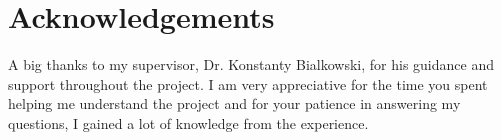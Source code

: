 
\chapter*{Acknowledgements \label{sec:acknowledgements}}

A big thanks to my supervisor, Dr. Konstanty Bialkowski, for his guidance and support throughout the project. I am very appreciative for the time you spent helping me understand the project and for your patience in answering my questions, I gained a lot of knowledge from the experience.